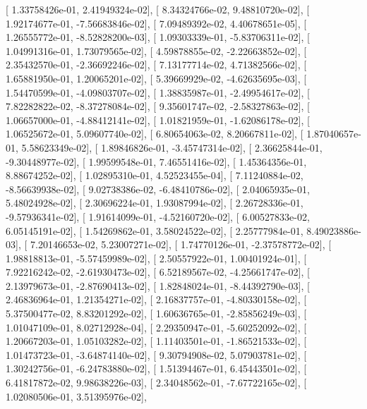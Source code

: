 \documentclass{article}
\begin{document}
       [  1.33758426e-01,   2.41949324e-02],
       [  8.34324766e-02,   9.48810720e-02],
       [  1.92174677e-01,  -7.56683846e-02],
       [  7.09489392e-02,   4.40678651e-05],
       [  1.26555772e-01,  -8.52828200e-03],
       [  1.09303339e-01,  -5.83706311e-02],
       [  1.04991316e-01,   1.73079565e-02],
       [  4.59878855e-02,  -2.22663852e-02],
       [  2.35432570e-01,  -2.36692246e-02],
       [  7.13177714e-02,   4.71382566e-02],
       [  1.65881950e-01,   1.20065201e-02],
       [  5.39669929e-02,  -4.62635695e-03],
       [  1.54470599e-01,  -4.09803707e-02],
       [  1.38835987e-01,  -2.49954617e-02],
       [  7.82282822e-02,  -8.37278084e-02],
       [  9.35601747e-02,  -2.58327863e-02],
       [  1.06657000e-01,  -4.88412141e-02],
       [  1.01821959e-01,  -1.62086178e-02],
       [  1.06525672e-01,   5.09607740e-02],
       [  6.80654063e-02,   8.20667811e-02],
       [  1.87040657e-01,   5.58623349e-02],
       [  1.89846826e-01,  -3.45747314e-02],
       [  2.36625844e-01,  -9.30448977e-02],
       [  1.99599548e-01,   7.46551416e-02],
       [  1.45364356e-01,   8.88674252e-02],
       [  1.02895310e-01,   4.52523455e-04],
       [  7.11240884e-02,  -8.56639938e-02],
       [  9.02738386e-02,  -6.48410786e-02],
       [  2.04065935e-01,   5.48024928e-02],
       [  2.30696224e-01,   1.93087994e-02],
       [  2.26728336e-01,  -9.57936341e-02],
       [  1.91614099e-01,  -4.52160720e-02],
       [  6.00527833e-02,   6.05145191e-02],
       [  1.54269862e-01,   3.58024522e-02],
       [  2.25777984e-01,   8.49023886e-03],
       [  7.20146653e-02,   5.23007271e-02],
       [  1.74770126e-01,  -2.37578772e-02],
       [  1.98818813e-01,  -5.57459989e-02],
       [  2.50557922e-01,   1.00401924e-01],
       [  7.92216242e-02,  -2.61930473e-02],
       [  6.52189567e-02,  -4.25661747e-02],
       [  2.13979673e-01,  -2.87690413e-02],
       [  1.82848024e-01,  -8.44392790e-03],
       [  2.46836964e-01,   1.21354271e-02],
       [  2.16837757e-01,  -4.80330158e-02],
       [  5.37500477e-02,   8.83201292e-02],
       [  1.60636765e-01,  -2.85856249e-03],
       [  1.01047109e-01,   8.02712928e-04],
       [  2.29350947e-01,  -5.60252092e-02],
       [  1.20667203e-01,   1.05103282e-02],
       [  1.11403501e-01,  -1.86521533e-02],
       [  1.01473723e-01,  -3.64874140e-02],
       [  9.30794908e-02,   5.07903781e-02],
       [  1.30242756e-01,  -6.24783880e-02],
       [  1.51394467e-01,   6.45443501e-02],
       [  6.41817872e-02,   9.98638226e-03],
       [  2.34048562e-01,  -7.67722165e-02],
       [  1.02080506e-01,   3.51395976e-02],
\end{document}

